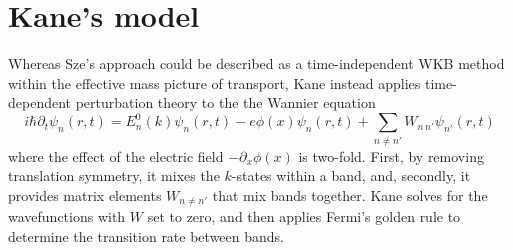 \section{Kane's model}
Whereas Sze's approach could be described as a time-independent WKB method within the effective mass picture of transport, Kane instead applies time-dependent perturbation theory to the the Wannier equation
$$i\hbar\partial_t\psi_n(r,t)=E_n^0(k)\psi_n(r,t)-e\phi(x)\psi_n(r,t)+\sum_{n\neq n'} W_{n\,n'}\psi_{n'}(r,t)$$
where the effect of the electric field $-\partial_x\phi(x)$ is two-fold.  First, by removing translation symmetry, it mixes the $k$-states within a band, and, secondly, it provides matrix elements $W_{n\neq n'}$ that mix bands together.  Kane solves for the wavefunctions with $W$ set to zero, and then applies Fermi's golden rule to determine the transition rate between bands.
